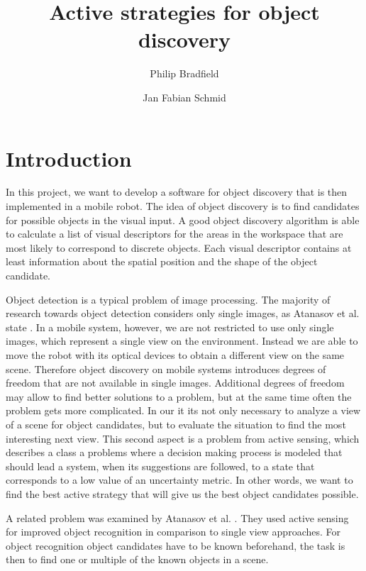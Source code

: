 \documentclass[a4paper,11pt,english]{article}
\begin{document}
\title{Active strategies for object discovery}
\author{Philip Bradfield \and Jan Fabian Schmid}
	
\maketitle 

\section{Introduction}
In this project, we want to develop a software for object discovery that is then implemented in a mobile robot.
The idea of object discovery is to find candidates for possible objects in the visual input. A good object discovery algorithm is able to calculate a list of visual descriptors for the areas in the workspace that are most likely to correspond to discrete objects.
Each visual descriptor contains at least information about the spatial position and the shape of the object candidate.

Object detection is a typical problem of image processing. The majority of research towards object detection considers only single images, as Atanasov et al. state \cite{atanasov2014nonmyopic}.
In a mobile system, however, we are not restricted to use only single images, which represent a single view on the environment. Instead we are able to move the robot with its optical devices to obtain a different view on the same scene.
Therefore object discovery on mobile systems introduces degrees of freedom that are not available in single images.
Additional degrees of freedom may allow to find better solutions to a problem, but at the same time often the problem gets more complicated.
In our it its not only necessary to analyze a view of a scene for object candidates, but to evaluate the situation to find the most interesting next view.
This second aspect is a problem from active sensing, which describes a class a problems where a decision making process is modeled that should lead a system, when its suggestions are followed, to a state that corresponds to a low value of an uncertainty metric.
In other words, we want to find the best active strategy that will give us the best object candidates possible.\medskip

A related problem was examined by Atanasov et al. \cite{atanasov2014nonmyopic}. They used active sensing for improved object recognition in comparison to single view approaches.
For object recognition object candidates have to be known beforehand, the task is then to find one or multiple of the known objects in a scene.
\end{document}
